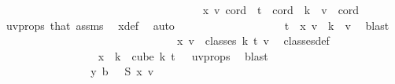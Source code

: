 \begin{isabellebody}
\ \isanewline
\ \ \ \ \ \ \ \ \ \ \ \ \ \ \isacommand{{\isacharbraceleft}{\kern0pt}}\isamarkupfalse%
\ \ \isanewline
\ \ \ \ \ \ \ \ \ \ \ \ \ \ \ \ \isamarkupfalse%
\ {\isachardoublequoteopen}x\ v\ cord\ {\isasymnoteq}\ t{\isachardoublequoteclose}\ \ {\isachardoublequoteopen}cord\ {\isasymin}\ {\isacharbraceleft}{\kern0pt}{\isachardot}{\kern0pt}{\isachardot}{\kern0pt}{\isacharless}{\kern0pt}k\ {\isacharminus}{\kern0pt}\ v{\isacharbraceright}{\kern0pt}{\isachardoublequoteclose}\ \ cord\ \isamarkupfalse%
\ uv{\isacharunderscore}{\kern0pt}props\ that\ assms{\isacharparenleft}{\kern0pt}{}{\isacharparenright}{\kern0pt}\ \isamarkupfalse%
\ x{\isacharunderscore}{\kern0pt}def\ \isamarkupfalse%
\ auto\isanewline
\ \ \ \ \ \ \ \ \ \ \ \ \ \ \ \ \isamarkupfalse%
\ \isamarkupfalse%
\ {\isachardoublequoteopen}t\ {\isasymnotin}\ x\ v\ {\isacharbackquote}{\kern0pt}\ {\isacharbraceleft}{\kern0pt}{\isachardot}{\kern0pt}{\isachardot}{\kern0pt}{\isacharless}{\kern0pt}k\ {\isacharminus}{\kern0pt}\ v{\isacharbraceright}{\kern0pt}{\isachardoublequoteclose}\ \isamarkupfalse%
\ blast\isanewline
\ \ \ \ \ \ \ \ \ \ \ \ \ \ \isacommand{{\isacharbraceright}{\kern0pt}}\isamarkupfalse%
\isanewline
\ \ \ \ \ \ \ \ \ \ \ \ \ \ \isamarkupfalse%
\ \isamarkupfalse%
\ {\isachardoublequoteopen}x\ v\ {\isasymin}\ classes\ k\ t\ v{\isachardoublequoteclose}\ \isamarkupfalse%
\ classes{\isacharunderscore}{\kern0pt}def\ \isanewline
\ \ \ \ \ \ \ \ \ \ \ \ \ \ \ \ \isamarkupfalse%
\ {\isacartoucheopen}x\ {\isacharbackquote}{\kern0pt}\ {\isacharbraceleft}{\kern0pt}{\isachardot}{\kern0pt}{\isachardot}{\kern0pt}k{\isacharbraceright}{\kern0pt}\ {\isasymsubseteq}\ cube\ k\ {\isacharparenleft}{\kern0pt}t\ {\isacharplus}{\kern0pt}\ {}{\isacharparenright}{\kern0pt}{\isacartoucheclose}\ uv{\isacharunderscore}{\kern0pt}props\ \isamarkupfalse%
\ blast\isanewline
\ \ \ \ \ \ \ \ \ \ \ \ \isamarkupfalse%
\isanewline
\ \ \ \ \ \ \ \ \ \ \ \ \isamarkupfalse%
\ \isamarkupfalse%
\ {\isachardoublequoteopen}{\isasymchi}\ {\isacharparenleft}{\kern0pt}y\ b{\isacharparenright}{\kern0pt}\ {\isacharequal}{\kern0pt}\ {\isasymchi}\ {\isacharparenleft}{\kern0pt}S\ {\isacharparenleft}{\kern0pt}x\ v{\isacharparenright}{\kern0pt}{\isacharparenright}{\kern0pt}{\isachardoublequoteclose}\ \isamarkupfalse%

\end{isabellebody}
